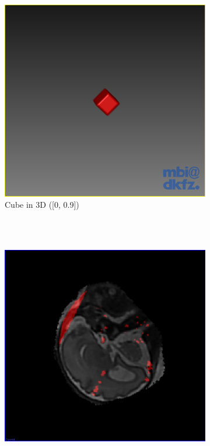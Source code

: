 \begin{figure}[H]
\begin{subfigure}[b]{0.5\textwidth}
    \includegraphics[width=\textwidth]{images/thresholding/results/cube_3d.png}
    \caption{Cube in 3D ([0, 0.9])}
    \label{fig:thresholdingresultscube3d}
  \end{subfigure}\\[11pt]
  ~ %
  \begin{subfigure}[b]{0.5\textwidth}
    \includegraphics[width=\textwidth]{images/thresholding/results/scan_2d.png}

\end{subfigure}
\end{figure}
